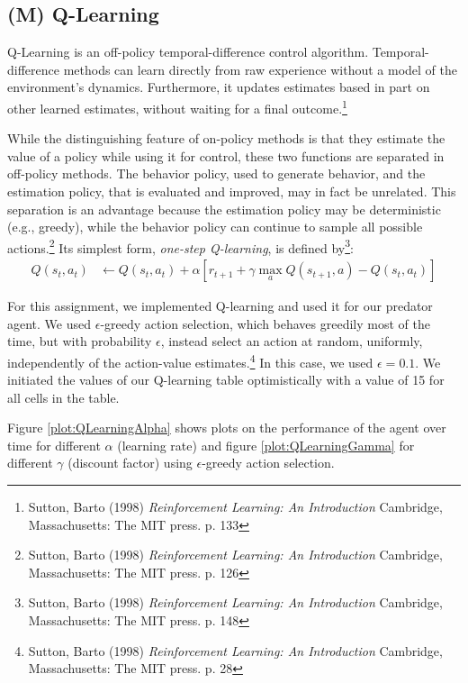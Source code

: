 \documentclass{article}
\begin{document}
\subsection{(M) Q-Learning}\label{sec:exercise1}
Q-Learning is an off-policy temporal-difference control algorithm. Temporal-difference methods can learn directly from raw experience without a model of the environment's dynamics. Furthermore, it updates estimates based in part on other learned estimates, without waiting for a final outcome.\footnote{Sutton, Barto (1998) \textit{Reinforcement Learning: An Introduction} Cambridge, Massachusetts: The MIT press. p. 133}

While the distinguishing feature of on-policy methods is that they estimate the value of a policy while using it for control, these two functions are separated in off-policy methods. The behavior policy, used to generate behavior, and the estimation policy, that is evaluated and improved, may in fact be unrelated. This separation is an advantage because the estimation policy may be deterministic (e.g., greedy), while the behavior policy can continue to sample all possible actions.\footnote{Sutton, Barto (1998) \textit{Reinforcement Learning: An Introduction} Cambridge, Massachusetts: The MIT press. p. 126} Its simplest form, \textit{one-step Q-learning}, is defined by\footnote{Sutton, Barto (1998) \textit{Reinforcement Learning: An Introduction} Cambridge, Massachusetts: The MIT press. p. 148}:
\begin{align*}
Q(s_t,a_t) & \leftarrow Q(s_t,a_t) + \alpha \left[ r_{t+1} + \gamma \displaystyle\max_a Q(s_{t+1},a) - Q(s_t,a_t) \right]
\end{align*}

For this assignment, we implemented Q-learning and used it for our predator agent. We used $\epsilon$-greedy action selection, which behaves greedily most of the time, but with probability $\epsilon$, instead select an action at random, uniformly, independently of the action-value estimates.\footnote{Sutton, Barto (1998) \textit{Reinforcement Learning: An Introduction} Cambridge, Massachusetts: The MIT press. p. 28} In this case, we used $\epsilon = 0.1$. We initiated the values of our Q-learning table optimistically with a value of 15 for all cells in the table.

Figure \ref{plot:QLearningAlpha} shows plots on the performance of the agent over time for different $\alpha$ (learning rate) and figure  \ref{plot:QLearningGamma} for different $\gamma$ (discount factor) using $\epsilon$-greedy action selection.
\end{document}
